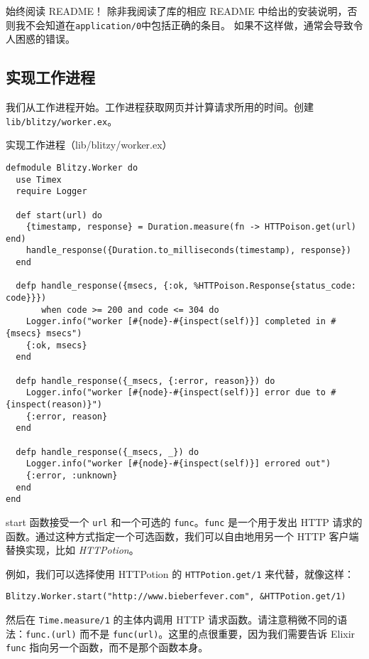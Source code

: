 \begin{note}{始终阅读 README！}
  除非我阅读了库的相应 README 中给出的安装说明，否则我不会知道在\texttt{application/0}中包括正确的条目。
  如果不这样做，通常会导致令人困惑的错误。
\end{note}


\subsection{实现工作进程}

我们从工作进程开始。工作进程获取网页并计算请求所用的时间。创建
\texttt{lib/blitzy/worker.ex}。

\begin{code}{实现工作进程（lib/blitzy/worker.ex）}

\begin{verbatim}
defmodule Blitzy.Worker do
  use Timex
  require Logger

  def start(url) do
    {timestamp, response} = Duration.measure(fn -> HTTPoison.get(url) end)
    handle_response({Duration.to_milliseconds(timestamp), response})
  end

  defp handle_response({msecs, {:ok, %HTTPoison.Response{status_code: code}}})
       when code >= 200 and code <= 304 do
    Logger.info("worker [#{node}-#{inspect(self)}] completed in #{msecs} msecs")
    {:ok, msecs}
  end

  defp handle_response({_msecs, {:error, reason}}) do
    Logger.info("worker [#{node}-#{inspect(self)}] error due to #{inspect(reason)}")
    {:error, reason}
  end

  defp handle_response({_msecs, _}) do
    Logger.info("worker [#{node}-#{inspect(self)}] errored out")
    {:error, :unknown}
  end
end
\end{verbatim}
\end{code}

start 函数接受一个 \texttt{url} 和一个可选的
\texttt{func}。\texttt{func}
是一个用于发出 HTTP
请求的函数。通过这种方式指定一个可选函数，我们可以自由地用另一个 HTTP
客户端替换实现，比如 \emph{HTTPotion}。

例如，我们可以选择使用 HTTPotion 的
\texttt{HTTPotion.get/1} 来代替，就像这样：

\texttt{Blitzy.Worker.start("http://www.bieberfever.com", \&HTTPotion.get/1)}

然后在 \texttt{Time.measure/1} 的主体内调用 HTTP
请求函数。请注意稍微不同的语法：\texttt{func.(url)}
而不是
\texttt{func(url)}。这里的点很重要，因为我们需要告诉
Elixir \texttt{func}
指向另一个函数，而不是那个函数本身。

